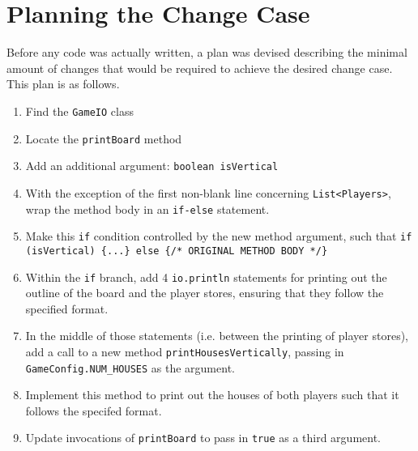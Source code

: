 \documentclass[10pt, a4paper, conference]{IEEEtran}
\begin{document}
\section{Planning the Change Case}
Before any code was actually written, a plan was devised describing the minimal
amount of changes that would be required to achieve the desired change case.
This plan is as follows.
\begin{enumerate}
  \item Find the \texttt{GameIO} class
  \item Locate the \texttt{printBoard} method
  \item Add an additional argument: \texttt{boolean isVertical}
  \item With the exception of the first non-blank line concerning
    \texttt{List<Players>}, wrap the method body in an \texttt{if-else} statement.
  \item Make this \texttt{if} condition controlled by the new method argument, such that
    \texttt{if (isVertical) \{...\} else \{/* ORIGINAL METHOD BODY */\}}
  \item Within the \texttt{if} branch, add 4 \texttt{io.println} statements for
    printing out the outline of the board and the player stores, ensuring that
    they follow the specified format.
  \item In the middle of those statements (i.e. between the printing of player
    stores), add a call to a new method
    \texttt{printHousesVertically}, passing in \texttt{GameConfig.NUM\_HOUSES}
    as the argument.
  \item Implement this method to print out the houses of both players such that
    it follows the specifed format.
  \item Update invocations of \texttt{printBoard} to pass in \texttt{true} as a third argument.
\end{enumerate}
\end{document}
